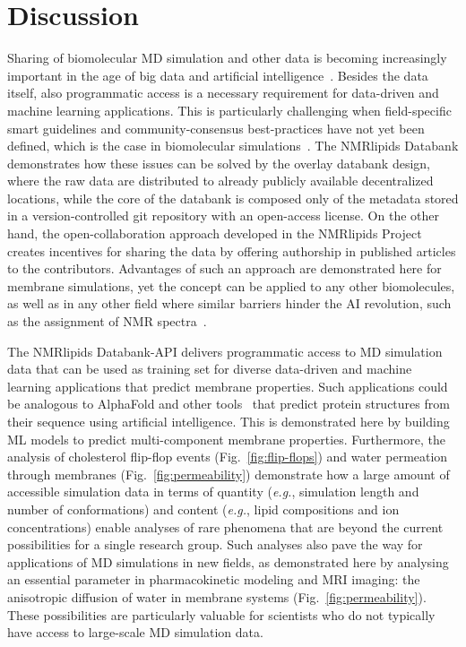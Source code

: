 \documentclass[fleqn,10pt]{wlscirep}
\begin{document}
\section{Discussion}

Sharing of biomolecular MD simulation and other data is becoming increasingly important in the age of big data and artificial intelligence~\cite{sever23,tiemann23}.  Besides the data itself, also programmatic access is a necessary requirement for data-driven and machine learning applications. This is particularly challenging when field-specific smart guidelines and community-consensus best-practices have not yet been defined, which is the case in biomolecular simulations~\cite{tiemann23}. The NMRlipids Databank demonstrates how these issues can be solved by the overlay databank design, where the raw data are distributed to already publicly available decentralized locations, while the core of the databank is composed only of the metadata stored in a version-controlled git repository with an open-access license. On the other hand, the open-collaboration approach developed in the NMRlipids Project~\cite{botan15} creates incentives for sharing the data by offering authorship in published articles to the contributors. Advantages of such an approach are demonstrated here for membrane simulations, yet the concept can be applied to any other biomolecules, as well as in any other field where similar barriers hinder the AI revolution, such as the assignment of NMR spectra~\cite{klukowski22}. 

The NMRlipids Databank-API delivers programmatic access to MD simulation data that can be used as training set for diverse data-driven and machine learning applications that predict membrane properties. Such applications could be analogous to AlphaFold \cite{jumper21} and other tools~\cite{baek21,lin23} that predict protein structures from their sequence using artificial intelligence. This is demonstrated here by building ML models to predict multi-component membrane properties. Furthermore, the analysis of cholesterol flip-flop events (Fig.~\ref{fig:flip-flops}) and water permeation through membranes (Fig.~\ref{fig:permeability}) demonstrate how a large amount of accessible simulation data in terms of quantity (\textit{e.g.}, simulation length and number of conformations) and content (\textit{e.g.}, lipid compositions and ion concentrations) enable analyses of rare phenomena that are beyond the current possibilities for a single research group. Such analyses also pave the way for applications of MD simulations in new fields, as demonstrated here by analysing an essential parameter in pharmacokinetic modeling and MRI imaging:\cite{nitsche19,topgaard20} the anisotropic diffusion of water in membrane systems (Fig.~\ref{fig:permeability}). These possibilities are particularly valuable for scientists who do not typically have access to large-scale MD simulation data. 
\end{document}
